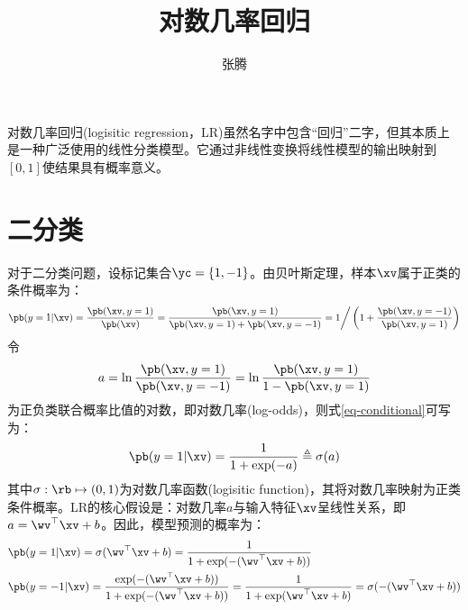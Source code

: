 \documentclass[a4paper,fleqn,fontset=none]{ctexart}
\newcommand{\Title}{对数几率回归}
\newcommand{\Author}{张腾}
\begin{document}
\title{\textbf{\Title}}
\author{\Author}
\maketitle

对数几率回归(logisitic regression，LR)虽然名字中包含“回归”二字，但其本质上是一种广泛使用的线性分类模型。它通过非线性变换将线性模型的输出映射到$[0,1]$使结果具有概率意义。

\section{二分类}

对于二分类问题，设标记集合$\yc = \{1,-1\}$。由贝叶斯定理，样本$\xv$属于正类的条件概率为：
\begin{align} \label{eq-conditional}
    \pb(y = 1 | \xv) = \frac{\pb(\xv, y=1)}{\pb(\xv)} = \frac{\pb(\xv, y=1)}{\pb(\xv, y=1) + \pb(\xv, y=-1)} = 1 \bigg/ \left( 1 + \frac{\pb(\xv, y=-1)}{\pb(\xv, y=1)} \right)
\end{align}
令
\begin{align*}
    a = \ln \frac{\pb(\xv, y = 1)}{\pb(\xv, y = -1)} = \ln \frac{\pb(\xv, y = 1)}{1 - \pb(\xv, y = 1)}
\end{align*}
为正负类联合概率比值的对数，即对数几率(log-odds)，则式\eqref{eq-conditional}可写为：
\begin{align*}
    \pb(y = 1 | \xv) = \frac{1}{1 + \exp(-a)} \triangleq \sigma(a)
\end{align*}
其中$\sigma: \rb \mapsto (0,1)$为对数几率函数(logisitic function)，其将对数几率映射为正类条件概率。LR的核心假设是：对数几率$a$与输入特征$\xv$呈线性关系，即$a = \wv^\top \xv + b$。因此，模型预测的概率为：
\begin{align*}
     & \pb(y = 1 | \xv) = \sigma(\wv^\top \xv + b) = \frac{1}{1 + \exp(-(\wv^\top \xv + b))}                                                                    \\
     & \pb(y = -1 | \xv) = \frac{\exp(-(\wv^\top \xv + b))}{1 + \exp(-(\wv^\top \xv + b))} = \frac{1}{1 + \exp(\wv^\top \xv + b)} = \sigma(-(\wv^\top \xv + b))
\end{align*}
\end{document}

